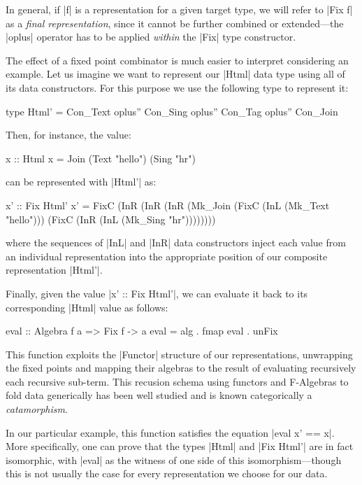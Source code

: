 In general, if |f| is a representation for a given target type, we will refer to
|Fix f| as a \emph{final representation}, since it cannot be further combined or
extended---the |oplus| operator has to be applied \emph{within} the |Fix| type
constructor.


The effect of a fixed point combinator is much easier to interpret considering
an example.
%
Let us imagine we want to represent our |Html| data type using all of its data
constructors.
%
For this purpose we use the following type to represent it:

\begin{code}
type Html' = Con_Text oplus'' Con_Sing oplus'' Con_Tag oplus'' Con_Join
\end{code}
%
Then, for instance, the value:

\begin{code}
  x :: Html
  x = Join (Text "hello") (Sing "hr")
\end{code}
%
can be represented with |Html'| as:

\begin{code}
  x' ::  Fix Html'
  x' =   FixC  (InR  (InR (InR (Mk_Join
               (FixC (InL (Mk_Text "hello")))
               (FixC (InR (InL (Mk_Sing "hr"))))))))
\end{code}
%
where the sequences of |InL| and |InR| data constructors inject each value from
an individual representation into the appropriate position of our composite
representation |Html'|.


Finally, given the value |x' :: Fix Html'|, we can evaluate it back to its
corresponding |Html| value as follows:

\begin{code}
eval :: Algebra f a => Fix f -> a
eval = alg . fmap eval . unFix
\end{code}
%
This function exploits the |Functor| structure of our representations,
unwrapping the fixed points and mapping their algebras to the result of
evaluating recursively each recursive sub-term.
%
This recusion schema using functors and F-Algebras to fold data generically has
been well studied and is known categorically a \emph{catamorphism}.

In our particular example, this function satisfies the equation |eval x' == x|.
%
More specifically, one can prove that the types |Html| and |Fix Html'| are in
fact isomorphic, with |eval| as the witness of one side of this
isomorphism---though this is not usually the case for every representation we
choose for our data.


